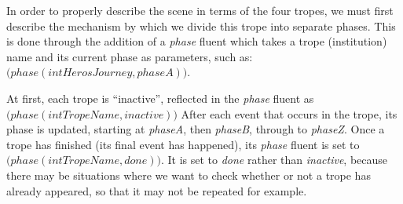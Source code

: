 In order to properly describe the scene in terms of the four tropes, we must
first describe the mechanism by which we divide this trope into separate phases.
This is done through the addition of a \emph{phase} fluent which takes a trope
(institution) name and its current phase as parameters, such as:
$\mathtt(phase(intHerosJourney, phaseA))$.

At first, each trope is ``inactive'', reflected in the \emph{phase} fluent as
$\mathtt(phase(intTropeName, inactive))$ After each event that occurs in the
trope, its phase is updated, starting at \emph{phaseA}, then \emph{phaseB},
through to \emph{phaseZ}. Once a trope has finished (its final event has
happened), its \emph{phase} fluent is set to $\mathtt(phase(intTropeName,
done))$. It is set to \emph{done} rather than \emph{inactive}, because there may
be situations where we want to check whether or not a trope has already
appeared, so that it may not be repeated for example.

